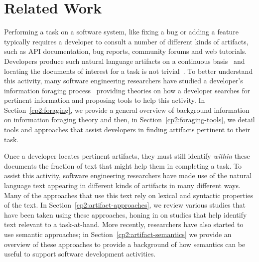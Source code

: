 \setcounter{chapter}{1}


\chapter{Related Work}
\label{ch:related-work}








Performing a task on a software system, like fixing a bug
or adding a feature typically requires a developer to consult
a number of different kinds of artifacts, such
as API documentation, bug reports, community forums
and web tutorials. 
Developers produce such natural language artifacts on a 
continuous basis~\cite{Rastkar2013t} 
and locating the documents of interest for a task
is not trivial~\cite{Starke2009}. 
To better understand this activity, 
many software engineering researchers 
have studied  a developer's information foraging process~\cite{Pirolli1999}
providing theories on how a developer searches for pertinent information
and proposing tools to help this activity.
In Section~\ref{cp2:foraging},
we provide a general overview of background information on 
information foraging theory and 
then, in Section~\ref{cp2:foraging-tools}, we detail tools and approaches that assist developers in finding artifacts pertinent to their task.



Once a developer locates pertinent artifacts, 
they must still identify \textit{within} these documents 
the fraction of text that might help them in completing a task.
To assist this activity, software engineering researchers have made use of the natural language text appearing in different kinds of artifacts in many different ways.
Many of the approaches that
use this text rely on lexical and syntactic properties of the text. 
In Section~\ref{cp2:artifact-approaches}, we review various studies that have been taken using these approaches,
honing in on studies that help identify text relevant to a task-at-hand.
More recently, researchers have also started to use semantic approaches; 
in Section~\ref{cp2:artifact-semantics} we 
provide an overview of these approaches to provide a background of
how semantics can be useful to support software development activities.









